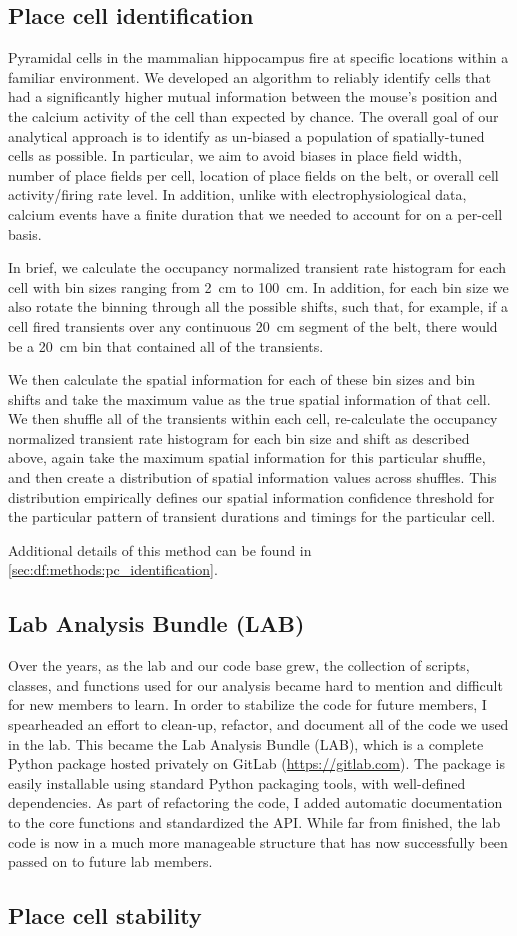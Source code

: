 \subsection{Place cell identification}
Pyramidal cells in the mammalian hippocampus fire at specific locations within a familiar environment.
We developed an algorithm to reliably identify cells that had a significantly higher mutual information between the mouse's position and the calcium activity of the cell than expected by chance.
The overall goal of our analytical approach is to identify as un-­biased a population of spatially-­tuned cells as possible.
In particular, we aim to avoid biases in place  field width, number of place fields per cell, location of place fields on the belt, or overall cell activity/firing rate level.
In addition, unlike with electrophysiological data, calcium events have a finite duration that we needed to account for on a per-­cell basis.  

In brief, we calculate the occupancy normalized transient rate histogram for each cell with bin sizes ranging from 2~cm to 100~cm.
In addition, for each bin size we also rotate the binning through all the possible shifts, such that, for example, if a cell fired transients over any continuous 20~cm segment of the belt, there would be a 20~cm bin that contained all of the transients.

We then calculate the spatial information for each of these bin sizes and bin shifts and take the maximum value as the true spatial information of that cell.
We then shuffle all of the transients within each cell, re-­calculate the occupancy normalized transient rate histogram for each bin size and shift as described above, again take the maximum spatial information for this particular shuffle, and then create a distribution of spatial information values across shuffles.
This distribution empirically defines our spatial information confidence threshold for the particular pattern of transient durations and timings for the particular cell.

Additional details of this method can be found in \autoref{sec:df:methods:pc_identification}.
 
\subsection{Lab Analysis Bundle (LAB)}
Over the years, as the lab and our code base grew, the collection of scripts, classes, and functions used for our analysis became hard to mention and difficult for new members to learn.
In order to stabilize the code for future members, I spearheaded an effort to clean-up, refactor, and document all of the code we used in the lab.
This became the Lab Analysis Bundle (LAB), which is a complete Python package hosted privately on GitLab (\url{https://gitlab.com}).
The package is easily installable using standard Python packaging tools, with well-defined dependencies.
As part of refactoring the code, I added automatic documentation to the core functions and standardized the API.
While far from finished, the lab code is now in a much more manageable structure that has now successfully been passed on to future lab members.

\subsection{Place cell stability}\label{sec:intro:techniques:place-cells}